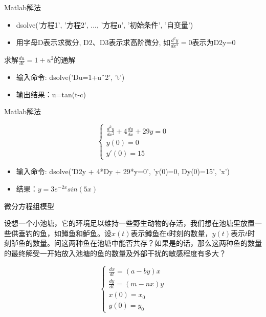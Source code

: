 \documentclass[UTF8]{ctexbeamer}
\begin{document}
\begin{frame}{Matlab解法}
  \begin{itemize}
  \item dsolve('方程1', '方程2', ..., '方程n', '初始条件', '自变量')
  \item 用字母D表示求微分, D2、D3表示求高阶微分, 如$\frac{d^2y}{dx^2}=0$表示为D2y=0
  \end{itemize}
  \begin{block}{}
    求解$\frac{du}{dt}=1+u^2$的通解
  \end{block}
  \begin{itemize}
  \item 输入命令: dsolve('Du=1+u\^\ 2', 't')
  \item 输出结果：u=tan(t-c)
  \end{itemize}
  
\end{frame}

\begin{frame}{Matlab解法}
  \begin{block}{}
  \[
  \left\{
  \begin{array}{l}
    \frac{d^2y}{dx^2} + 4\frac{dy}{dx} + 29y = 0\\
    y(0) = 0\\
    y'(0) = 15
  \end{array}
  \right.
  \]
  \end{block}

  \begin{itemize}
  \item 输入命令: dsolve('D2y + 4*Dy + 29*y=0', 'y(0)=0, Dy(0)=15', 'x')
  \item 结果：$y=3e^{-2x}sin(5x)$
  \end{itemize}
  
\end{frame}


\begin{frame}{微分方程组模型}
  \begin{block}{}
设想一个小池塘，它的环境足以维持一些野生动物的存活，我们想在池塘里放置一些供垂钓的鱼，如鳟鱼和鲈鱼。设$x(t)$表示鳟鱼在$t$时刻的数量，$y(t)$表示$t$时刻鲈鱼的数量。问这两种鱼在池塘中能否共存？如果是的话，那么这两种鱼的数量的最终解受一开始放入池塘的鱼的数量及外部干扰的敏感程度有多大？
  \end{block}

  \[
  \left\{
  \begin{array}{l}
    \frac{dx}{dt} = (a-by)x\\
    \frac{dy}{dt} = (m-nx)y\\
    x(0) = x_0\\
    y(0) = y_0
  \end{array}
  \right.
  \]
\end{frame}
\end{document}
